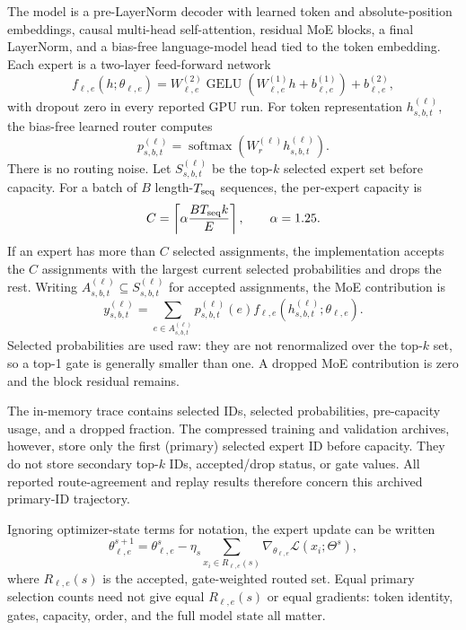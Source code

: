 \documentclass{article}
\begin{document}
The model is a pre-LayerNorm decoder with learned token and absolute-position
embeddings, causal multi-head self-attention, residual MoE blocks, a final
LayerNorm, and a bias-free language-model head tied to the token embedding.
Each expert is a two-layer feed-forward network
\begin{equation}
f_{\ell,e}(h;\theta_{\ell,e})
=
W_{\ell,e}^{(2)}
\operatorname{GELU}\!\left(W_{\ell,e}^{(1)}h+b_{\ell,e}^{(1)}\right)
+
b_{\ell,e}^{(2)},
\label{eq:app_expert}
\end{equation}
with dropout zero in every reported GPU run. For token representation
$h_{s,b,t}^{(\ell)}$, the bias-free learned router computes
\begin{equation}
p_{s,b,t}^{(\ell)}
=
\operatorname{softmax}\!\left(W_r^{(\ell)}h_{s,b,t}^{(\ell)}\right).
\label{eq:app_router}
\end{equation}
There is no routing noise. Let $S_{s,b,t}^{(\ell)}$ be the top-$k$ selected
expert set before capacity. For a batch of $B$ length-$T_{\rm seq}$ sequences,
the per-expert capacity is
\begin{equation}
C
=
\left\lceil
\alpha\frac{BT_{\rm seq}k}{E}
\right\rceil,
\qquad \alpha=1.25.
\label{eq:app_capacity}
\end{equation}
If an expert has more than $C$ selected assignments, the implementation accepts
the $C$ assignments with the largest current selected probabilities and drops
the rest. Writing $A_{s,b,t}^{(\ell)}\subseteq S_{s,b,t}^{(\ell)}$ for accepted
assignments, the MoE contribution is
\begin{equation}
y_{s,b,t}^{(\ell)}
=
\sum_{e\in A_{s,b,t}^{(\ell)}}
p_{s,b,t}^{(\ell)}(e)
f_{\ell,e}\!\left(h_{s,b,t}^{(\ell)};\theta_{\ell,e}\right).
\label{eq:app_moe_output}
\end{equation}
Selected probabilities are used raw: they are not renormalized over the top-$k$
set, so a top-1 gate is generally smaller than one. A dropped MoE contribution
is zero and the block residual remains.

The in-memory trace contains selected IDs, selected probabilities, pre-capacity
usage, and a dropped fraction. The compressed training and validation archives,
however, store only the first (primary) selected expert ID before capacity. They
do not store secondary top-$k$ IDs, accepted/drop status, or gate values. All
reported route-agreement and replay results therefore concern this archived
primary-ID trajectory.

Ignoring optimizer-state terms for notation, the expert update can be written
\begin{equation}
\theta_{\ell,e}^{s+1}
=
\theta_{\ell,e}^{s}
-
\eta_s
\sum_{x_i\in R_{\ell,e}(s)}
\nabla_{\theta_{\ell,e}}
\mathcal{L}(x_i;\Theta^s),
\label{eq:app_expert_update}
\end{equation}
where $R_{\ell,e}(s)$ is the accepted, gate-weighted routed set. Equal primary
selection counts need not give equal $R_{\ell,e}(s)$ or equal gradients: token
identity, gates, capacity, order, and the full model state all matter.
\end{document}
